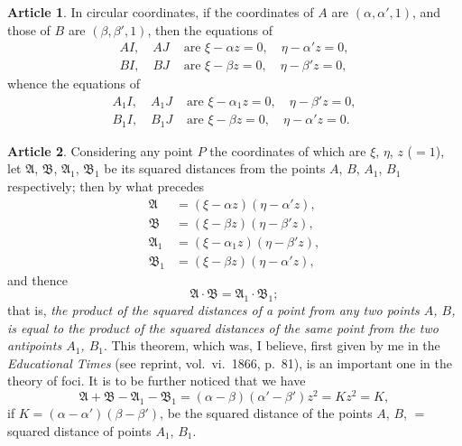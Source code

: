 \documentclass[11pt,a4paper]{article}
\theoremstyle{definition}
\newtheorem{art}{Article}
\begin{document}
\begin{art}
In circular coordinates, if the coordinates of $A$ are $(\alpha, \alpha', 1)$, and those of $B$ are $(\beta, \beta', 1)$, then the equations of
\begin{align*}
AI, \quad AJ &\text{ are } \xi - \alpha z = 0, \quad \eta - \alpha' z = 0, \\
BI, \quad BJ &\text{ are } \xi - \beta z = 0, \quad \eta - \beta' z = 0,
\end{align*}
whence the equations of
\begin{align*}
A_{1}I, \quad A_{1}J &\text{ are } \xi - \alpha_{1} z = 0, \quad \eta - \beta' z = 0, \\
B_{1}I, \quad B_{1}J &\text{ are } \xi - \beta z = 0, \quad \eta - \alpha' z = 0.
\end{align*}
\end{art}

\begin{art}
Considering any point $P$ the coordinates of which are $\xi$, $\eta$, $z$ ($= 1$), let $\mathfrak{A}$, $\mathfrak{B}$, $\mathfrak{A}_{1}$, $\mathfrak{B}_{1}$ be its squared distances from the points $A$, $B$, $A_{1}$, $B_{1}$ respectively; then by what precedes
\begin{align*}
\mathfrak{A} &= (\xi - \alpha z)(\eta - \alpha' z), \\
\mathfrak{B} &= (\xi - \beta z)(\eta - \beta' z), \\
\mathfrak{A}_{1} &= (\xi - \alpha_{1} z)(\eta - \beta' z), \\
\mathfrak{B}_{1} &= (\xi - \beta z)(\eta - \alpha' z),
\end{align*}
and thence
\[
\mathfrak{A} \cdot \mathfrak{B} = \mathfrak{A}_{1} \cdot \mathfrak{B}_{1};
\]
that is, \textit{the product of the squared distances of a point from any two points $A$, $B$, is equal to the product of the squared distances of the same point from the two antipoints $A_{1}$, $B_{1}$}. This theorem, which was, I believe, first given by me in the \textit{Educational Times} (see reprint, vol.\ vi.\ 1866, p.\ 81), is an important one in the theory of foci. It is to be further noticed that we have
\[
\mathfrak{A} + \mathfrak{B} - \mathfrak{A}_{1} - \mathfrak{B}_{1} = (\alpha - \beta)(\alpha' - \beta')z^{2} = Kz^{2} = K,
\]
if $K = (\alpha - \alpha')(\beta - \beta')$, be the squared distance of the points $A$, $B$, $=$ squared distance of points $A_{1}$, $B_{1}$.
\end{art}
\end{document}
